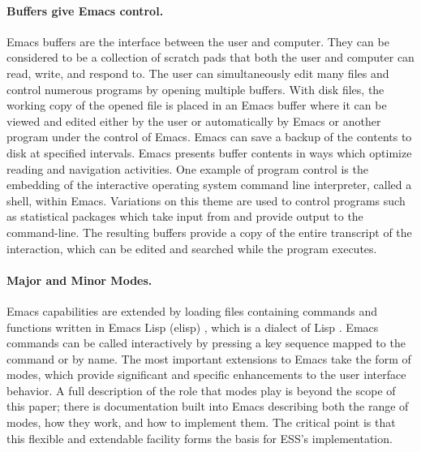 \documentclass{article}
\newcommand{\stexttt}[1]{{\small\texttt{#1}}}
\begin{document}
\paragraph{Buffers give Emacs control.}
Emacs buffers are the interface between the user and computer.  They
can be considered to be a collection of scratch pads that both the
user and computer can read, write, and respond to.  The user can
simultaneously edit many files and control numerous programs by
opening multiple buffers.  With disk files, the working copy of the
opened file is placed in an Emacs buffer where it can be viewed and
edited either by the user or automatically by Emacs or another program
under the control of Emacs.  Emacs can save a backup of the contents
to disk at specified intervals.  Emacs presents buffer contents in
ways which optimize reading and navigation activities.  One example of
program control is the embedding of the interactive operating system
command line interpreter, called a shell, within Emacs.  Variations on
this theme are used to control programs such as statistical packages
which take input from and provide output to the command-line.  The
resulting buffers provide a copy of the entire transcript of the
interaction, which can be edited and searched while the program
executes.

\paragraph{Major and Minor Modes.}
Emacs capabilities are extended by loading files containing commands
and functions written in Emacs Lisp (elisp) \citep{RChassell1999},
which is a dialect of Lisp \citep{PGraham:1996}.  Emacs commands can
be called interactively by pressing a key sequence mapped to the
command or by name.  The most important extensions to Emacs take the
form of modes, which provide significant and specific enhancements to
the user interface behavior.  A full description of the role that
modes play is beyond the scope of this paper; there is documentation
built into Emacs describing both the range of modes, how they work,
and how to implement them.  The critical point is that this flexible
and extendable facility forms the basis for ESS's implementation.

\end{document}
